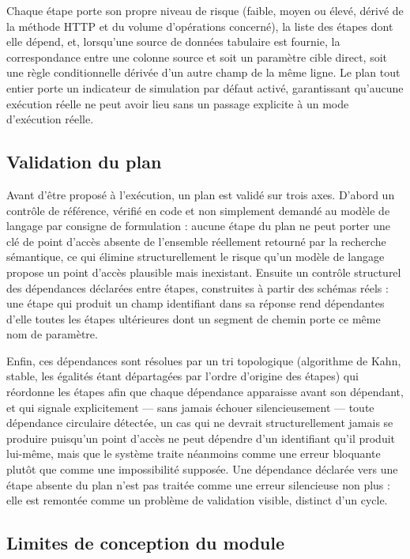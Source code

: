 Chaque étape porte son propre niveau de risque (faible, moyen ou élevé, dérivé de la méthode HTTP et du volume d'opérations concerné), la liste des étapes dont elle dépend, et, lorsqu'une source de données tabulaire est fournie, la correspondance entre une colonne source et soit un paramètre cible direct, soit une règle conditionnelle dérivée d'un autre champ de la même ligne. Le plan tout entier porte un indicateur de simulation par défaut activé, garantissant qu'aucune exécution réelle ne peut avoir lieu sans un passage explicite à un mode d'exécution réelle.

\subsection{Validation du plan}

Avant d'être proposé à l'exécution, un plan est validé sur trois axes. D'abord un contrôle de référence, vérifié en code et non simplement demandé au modèle de langage par consigne de formulation : aucune étape du plan ne peut porter une clé de point d'accès absente de l'ensemble réellement retourné par la recherche sémantique, ce qui élimine structurellement le risque qu'un modèle de langage propose un point d'accès plausible mais inexistant. Ensuite un contrôle structurel des dépendances déclarées entre étapes, construites à partir des schémas réels : une étape qui produit un champ identifiant dans sa réponse rend dépendantes d'elle toutes les étapes ultérieures dont un segment de chemin porte ce même nom de paramètre.

Enfin, ces dépendances sont résolues par un tri topologique (algorithme de Kahn, stable, les égalités étant départagées par l'ordre d'origine des étapes) qui réordonne les étapes afin que chaque dépendance apparaisse avant son dépendant, et qui signale explicitement — sans jamais échouer silencieusement — toute dépendance circulaire détectée, un cas qui ne devrait structurellement jamais se produire puisqu'un point d'accès ne peut dépendre d'un identifiant qu'il produit lui-même, mais que le système traite néanmoins comme une erreur bloquante plutôt que comme une impossibilité supposée. Une dépendance déclarée vers une étape absente du plan n'est pas traitée comme une erreur silencieuse non plus : elle est remontée comme un problème de validation visible, distinct d'un cycle.

\subsection{Limites de conception du module}


